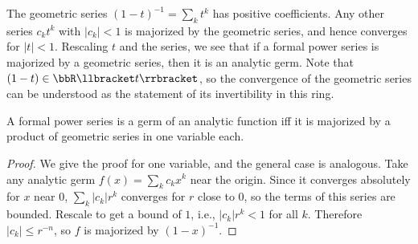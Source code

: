 \begin{example}
    The geometric series $(1-t)^{-1}=\sum_k t^k$ has positive coefficients. Any other series $c_k t^k$ with $|c_k|<1$ is majorized by the geometric series, and hence converges for $|t|<1$.  Rescaling $t$ and the series, we see that if a formal power series is majorized by a geometric series, then it is an analytic germ. Note that $(1-t)\in\bbR\llbracket t\rrbracket$, so the convergence of the geometric series can be understood as the statement of its invertibility in this ring.
\end{example}

\begin{lem}\label{lem 121}
    A formal power series is a germ of an analytic function iff it is majorized by a product of geometric series in one variable each.
\end{lem}
\begin{proof}
    We give the proof for one variable, and the general case is analogous. Take any analytic germ $f(x)=\sum_k c_k x^k$ near the origin. Since it converges absolutely for $x$ near $0$, $\sum_k |c_k| r^k$ converges for $r$ close to $0$, so the terms of this series are bounded. Rescale to get a bound of $1$, i.e., $|c_k|r^k<1$ for all $k$. 
    Therefore $|c_k|\leq r^{-n}$, so $f$ is majorized by $(1-x)^{-1}$.
\end{proof}

